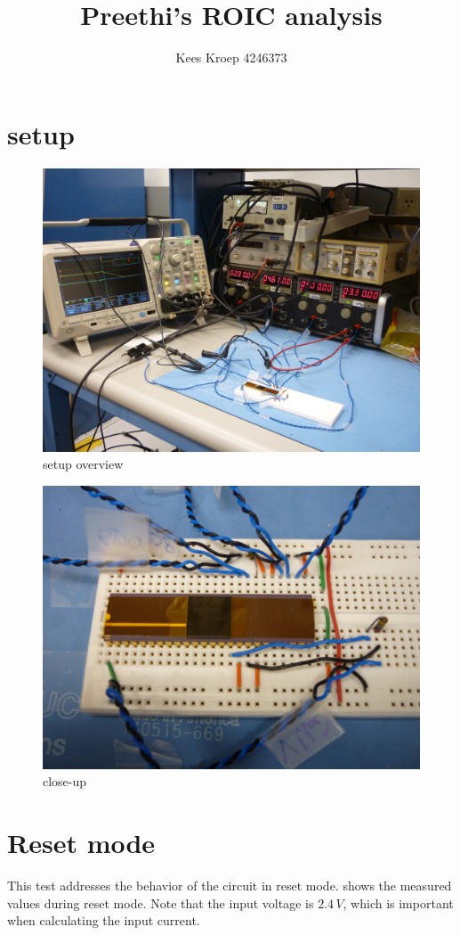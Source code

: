 \documentclass{article}
\title{Preethi's ROIC analysis}
\author{Kees Kroep 4246373}
\begin{document}
  \maketitle

\section{setup}\label{sec:setup}



\begin{figure}[h]
	\centering
	\includegraphics[width=0.6\linewidth]{fig/P1010158.JPG}
	\caption{setup overview}
	\label{fig:setup_overview}
\end{figure}

\begin{figure}[h]
	\centering
	\includegraphics[width=0.6\linewidth]{fig/P1010159.JPG}
	\caption{close-up}
	\label{fig:close-up}
\end{figure}

\clearpage

\section{Reset mode}
This test addresses the behavior of the circuit in reset mode.  shows the measured values during reset mode. Note that the input voltage is $2.4\,V$, which is important when calculating the input current. 
\end{document}
